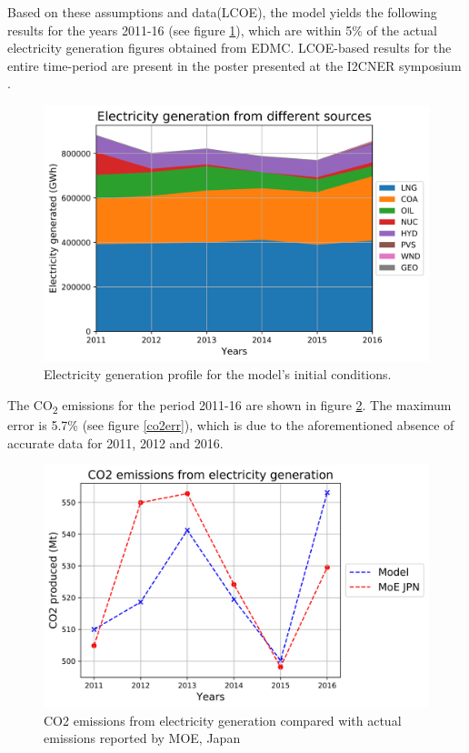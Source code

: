 \documentclass[14pt,a4paper]{article} %
\begin{document}
Based on these assumptions and data(\gls{LCOE}), the model yields the following results for the years 2011-16 (see figure \ref{elcic}), which are within 5\% of the actual electricity generation figures obtained from \gls{EDMC}. \gls{LCOE}-based results for the entire time-period are present in the poster presented at the \gls{I2CNER} symposium \cite{chaube_dynamic_2019}.

\begin{figure}[H]
\centering
\includegraphics[scale=0.6]{elc-2016}
\caption{Electricity generation profile for the model's initial conditions.}
\label{elcic}
\end{figure}

The CO\textsubscript{2} emissions for the period 2011-16 are shown in figure \ref{co2ic}. The maximum error is 5.7\% (see figure \ref{co2err}), which is due to the aforementioned absence of accurate data for 2011, 2012 and 2016. 

\begin{figure}[H]
\centering
\includegraphics[scale=0.6]{co2-2016}
\caption{CO2 emissions from electricity generation compared with actual emissions reported by \gls{MOE}, Japan}
\label{co2ic}
\end{figure}
\end{document}
